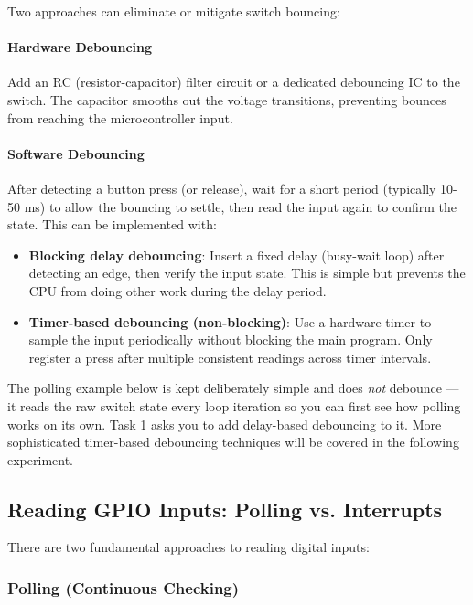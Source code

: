 Two approaches can eliminate or mitigate switch bouncing:

\paragraph{Hardware Debouncing}
Add an RC (resistor-capacitor) filter circuit or a dedicated debouncing IC to the switch. The capacitor smooths out the voltage transitions, preventing bounces from reaching the microcontroller input.

\paragraph{Software Debouncing}
After detecting a button press (or release), wait for a short period (typically 10-50 ms) to allow the bouncing to settle, then read the input again to confirm the state. This can be implemented with:
\begin{itemize}[nosep]
  \item \textbf{Blocking delay debouncing}: Insert a fixed delay (busy-wait loop) after detecting an edge, then verify the input state. This is simple but prevents the CPU from doing other work during the delay period.
  \item \textbf{Timer-based debouncing (non-blocking)}: Use a hardware timer to sample the input periodically without blocking the main program. Only register a press after multiple consistent readings across timer intervals.
\end{itemize}

\noindent
The polling example below is kept deliberately simple and does \emph{not} debounce — it reads the raw switch state every loop iteration so you can first see how polling works on its own. Task 1 asks you to add delay-based debouncing to it. More sophisticated timer-based debouncing techniques will be covered in the following experiment.

\subsection{Reading GPIO Inputs: Polling vs. Interrupts}

There are two fundamental approaches to reading digital inputs:

\subsubsection{Polling (Continuous Checking)}

